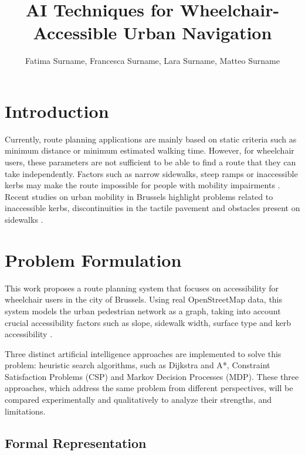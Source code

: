 \documentclass[letterpaper]{article} %
\title{AI Techniques for Wheelchair-Accessible Urban Navigation}
\author{
    Fatima Surname\equalcontrib,
    Francesca Surname\equalcontrib,
    Lara Surname\equalcontrib,
    Matteo Surname\equalcontrib
}
\begin{document}
\maketitle

\begin{abstract}

\end{abstract}

\begin{links}
\end{links}

\section{Introduction}

Currently, route planning applications are mainly based on static criteria such as minimum distance or minimum estimated walking time. However, for wheelchair users, these parameters are not sufficient to be able to find a route that they can take independently. Factors such as narrow sidewalks, steep ramps or inaccessible kerbs may make the route impossible for people with mobility impairments \cite{darko2022}. Recent studies on urban mobility in Brussels highlight problems related to inaccessible kerbs, discontinuities in the tactile pavement and obstacles present on sidewalks \cite{dobruszkes2025}.

\section{Problem Formulation}
\label{sec:problem}

This work proposes a route planning system that focuses on accessibility for wheelchair users in the city of Brussels. Using real OpenStreetMap data, this system models the urban pedestrian network as a graph, taking into account crucial accessibility factors such as slope, sidewalk width, surface type and kerb accessibility \cite{kaselouris2025}.

Three distinct artificial intelligence approaches are implemented to solve this problem: heuristic search algorithms, such as Dijkstra and A*, Constraint Satisfaction Problems (CSP) and Markov Decision Processes (MDP). These three approaches, which address the same problem from different perspectives, will be compared experimentally and qualitatively to analyze their strengths, and limitations.

\subsection{Formal Representation}
\end{document}
